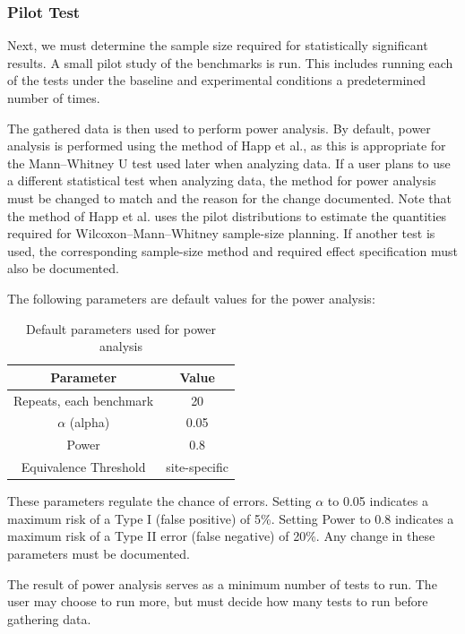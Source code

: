 \documentclass[conference]{IEEEtran}
\begin{document}
\subsubsection{Pilot Test}

Next, we must determine the sample size required for statistically significant 
results. A small pilot study of the benchmarks is run. This includes running 
each of the tests under the baseline and experimental conditions a 
predetermined number of times. 

The gathered data is then used to perform power analysis.
By default, power analysis is performed using the method of Happ et al.\cite{happOptimalSampleSize2019}, as this is appropriate for the Mann--Whitney U test 
used later when analyzing data. If a user plans to use a different statistical test 
when analyzing data, the method for power analysis must be changed to 
match and the reason for the change documented. Note that the 
method of Happ et al.\cite{happOptimalSampleSize2019} uses the pilot distributions to estimate the quantities required for Wilcoxon--Mann--Whitney sample-size planning. If another test is used, the corresponding sample-size method and required effect specification must also be documented.

The following parameters are default values for the power analysis:

\begin{table}[h!]
\centering
\begin{tabular}{| c | c |} 
    \hline
    Parameter & Value \\ [0.5ex] 
    \hline
    Repeats, each benchmark & 20 \\ 
    \hline
    $\alpha$ (alpha) & 0.05 \\ 
    \hline
    Power & 0.8 \\
    \hline
    Equivalence Threshold & site-specific \\
    \hline
\end{tabular}
\caption{Default parameters used for power analysis}
\label{table:power_params}
\end{table}

These parameters regulate the chance of errors. Setting $\alpha$ to 0.05
indicates a maximum risk of a Type I (false positive) of 5\%. Setting Power
to 0.8 indicates a maximum risk of a Type II error (false negative) of 20\%.
Any change in these parameters must be documented. 

The result of power analysis serves as a minimum number of tests to run. The user may choose to 
run more, but must decide how many tests to run before gathering data.
\end{document}
